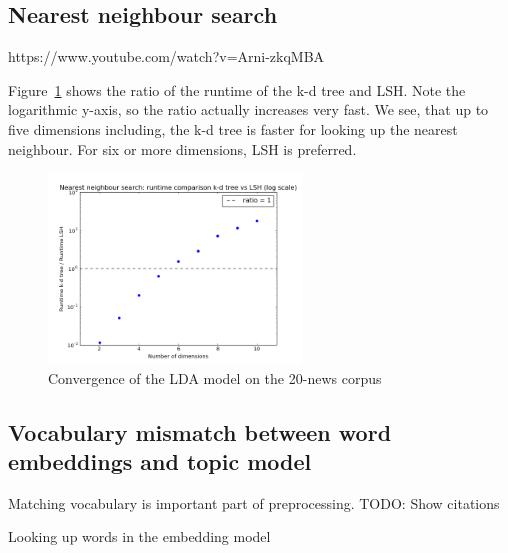 \documentclass[
        a4paper,
        titlepage,
        twoside,
        parskip
        ]{scrbook}
\theoremstyle{break}
\begin{document}
\subsection{Nearest neighbour search}
https://www.youtube.com/watch?v=Arni-zkqMBA

Figure~\ref{fig:lsh_vs_kdtree} shows the ratio of the runtime of the k-d tree and LSH.
Note the logarithmic y-axis, so the ratio actually increases very fast.
We see, that up to five dimensions including, the k-d tree is faster for looking up the nearest neighbour.
For six or more dimensions, LSH is preferred.
\begin{figure}
       \centering
       \includegraphics[width=0.6\textwidth]{figures/lsh_vs_kdtree.png}
       \caption{Convergence of the LDA model on the 20-news corpus}
       \label{fig:lsh_vs_kdtree}
\end{figure}
\subsection{Vocabulary mismatch between word embeddings and topic model}

Matching vocabulary is important part of preprocessing.
TODO: Show citations

\begin{algorithm}
  \caption{Looking up words in the embedding model}
  \label{euclid}
  \begin{algorithmic}[1]
      \State{}
      \State{}
      \State{}
    \EndIf
    \EndProcedure
  \end{algorithmic}
\end{algorithm}
\end{document}
